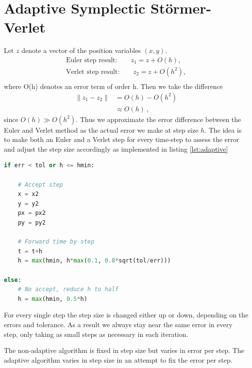 \section{Adaptive Symplectic Störmer-Verlet}
Let $z$ denote a vector of the position variables $(x,y)$.
\begin{align}
\text{Euler step result:} \qquad z_1 = z + O(h), \\
\text{Verlet step result:} \qquad z_2 = z + O(h^2), \\
\end{align}
where O(h) denotes an error term of order h. Then we take the difference
\begin{align}
\|z_1 - z_2\| &= O(h) - O(h^2) \\
&\approx O(h)\ ,
\end{align}
since $O(h) \gg O(h^2)$. Thus we approximate the error difference between the Euler and Verlet method as the actual error we make at step size $h$. The idea is to make both an Euler and a Verlet step for every time-step to assess the error and adjust the step size accordingly as implemented in listing \ref{lst:adaptive}
\begin{adjustwidth*}{0cm}{-0.4cm}
\begin{lstlisting}[language=Python,caption=Adaptive method implemented in python. We accept the Verlet step only if the error is no more than a given tolerance \texttt{tol}. Subsequently we estimate a new \texttt{h} that will yield an error of \texttt{tol} in the next step and use \texttt{0.8} of this value to avoid frequent rejects. If the step is rejected we reduce the step size by half,label=lst:adaptive]
if err < tol or h <= hmin:

    # Accept step
    x = x2
    y = y2
    px = px2
    py = py2

    # Forward time by step
    t = t+h
    h = max(hmin, h*max(0.1, 0.8*sqrt(tol/err)))

else:
    # No accept, reduce h to half
    h = max(hmin, 0.5*h)
\end{lstlisting}
\end{adjustwidth*}
For every single step the step size is changed either up or down, depending on the errors and tolerance. As a result we always stay near the same error in every step, only taking as small steps as necessary in each iteration.

The non-adaptive algorithm is fixed in step size but varies in error per step.
The adaptive algorithm varies in step size in an attempt to fix the error per step.

